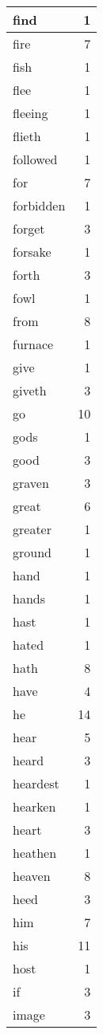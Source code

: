 \begin{center}
\begin{longtable}{l|r}
find & 1 \\ \hline
fire & 7 \\ \hline
fish & 1 \\ \hline
flee & 1 \\ \hline
fleeing & 1 \\ \hline
flieth & 1 \\ \hline
followed & 1 \\ \hline
for & 7 \\ \hline
forbidden & 1 \\ \hline
forget & 3 \\ \hline
forsake & 1 \\ \hline
forth & 3 \\ \hline
fowl & 1 \\ \hline
from & 8 \\ \hline
furnace & 1 \\ \hline
give & 1 \\ \hline
giveth & 3 \\ \hline
go & 10 \\ \hline
gods & 1 \\ \hline
good & 3 \\ \hline
graven & 3 \\ \hline
great & 6 \\ \hline
greater & 1 \\ \hline
ground & 1 \\ \hline
hand & 1 \\ \hline
hands & 1 \\ \hline
hast & 1 \\ \hline
hated & 1 \\ \hline
hath & 8 \\ \hline
have & 4 \\ \hline
he & 14 \\ \hline
hear & 5 \\ \hline
heard & 3 \\ \hline
heardest & 1 \\ \hline
hearken & 1 \\ \hline
heart & 3 \\ \hline
heathen & 1 \\ \hline
heaven & 8 \\ \hline
heed & 3 \\ \hline
him & 7 \\ \hline
his & 11 \\ \hline
host & 1 \\ \hline
if & 3 \\ \hline
image & 3 \\ \hline

\end{longtable}
\end{center}
